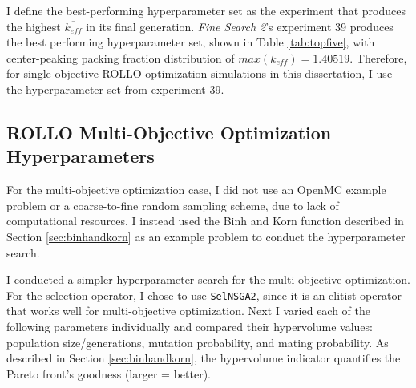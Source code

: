 I define the best-performing hyperparameter set as the experiment that produces 
the highest $\overline{k_{eff}}$ in its final generation. 
\textit{Fine Search 2}'s experiment 39 produces the best performing 
hyperparameter set, shown in Table \ref{tab:topfive}, with 
center-peaking packing fraction distribution of $max(k_{eff}) = 1.40519$. 
Therefore, for single-objective ROLLO optimization simulations in this dissertation, 
I use the hyperparameter set from experiment 39. 

\subsection{ROLLO Multi-Objective Optimization Hyperparameters}
For the multi-objective optimization case, I did not use an OpenMC example problem or 
a coarse-to-fine random sampling scheme, due to lack of computational resources. 
I instead used the Binh and Korn function described in Section \ref{sec:binhandkorn} as 
an example problem to conduct the hyperparameter search.

I conducted a simpler hyperparameter search for the multi-objective optimization. 
For the selection operator, I chose to use \texttt{SelNSGA2}, since it is an elitist 
operator that works well for multi-objective optimization. 
Next I varied each of the following parameters individually and compared their 
hypervolume values: population size/generations, mutation probability, and mating 
probability.
As described in Section \ref{sec:binhandkorn}, the hypervolume indicator quantifies 
the Pareto front's goodness (larger = better). 

